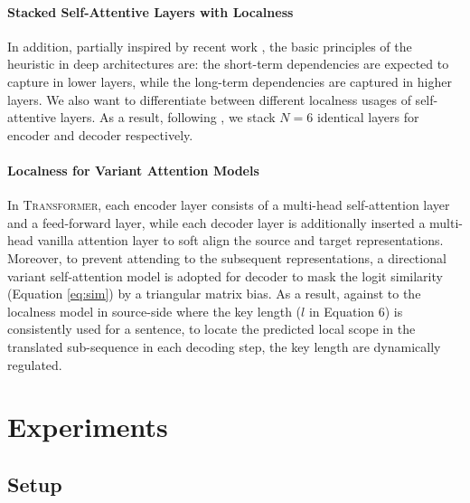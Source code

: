 \documentclass[11pt,a4paper]{article}
\begin{document}
\paragraph{Stacked Self-Attentive Layers with Localness}
In addition, partially inspired by recent work \cite{shi2016does,yang2017towards,Peters:2018:NAACL}, the basic principles of the heuristic in deep architectures are: the short-term dependencies are expected to capture in lower layers, while the long-term dependencies are captured in higher layers. We also want to differentiate between different localness usages of self-attentive layers.
As a result, following , we stack $N=6$ identical layers for encoder and decoder respectively.
\paragraph{Localness for Variant Attention Models}

In \textsc{Transformer}, each encoder layer consists of a multi-head self-attention layer and a feed-forward layer, while each decoder layer is additionally inserted a multi-head vanilla attention layer to soft align the source and target representations. Moreover, to prevent attending to the subsequent representations, a directional variant self-attention model \cite{shen2017disan} is adopted for decoder to mask the logit similarity (Equation \ref{eq:sim}) by a triangular matrix bias. As a result, against to  the localness model in source-side where the key length ($l$ in Equation 6)  is consistently used for a sentence, to locate the predicted local scope in the translated sub-sequence in each decoding step, the key length are dynamically regulated. 










\fi




\section{Experiments}

\subsection{Setup}
\label{sec:setup}
\end{document}
